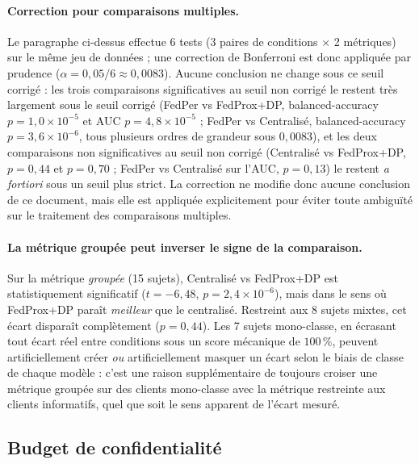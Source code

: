 \documentclass{acmart}
\begin{document}
\paragraph{Correction pour comparaisons multiples.} Le paragraphe ci-dessus
effectue 6 tests (3 paires de conditions $\times$ 2 métriques) sur le même
jeu de données ; une correction de Bonferroni est donc appliquée par
prudence ($\alpha = 0{,}05/6 \approx 0{,}0083$). Aucune conclusion ne change
sous ce seuil corrigé : les trois comparaisons significatives au seuil non
corrigé le restent très largement sous le seuil corrigé (FedPer vs
FedProx+DP, balanced-accuracy $p=1{,}0\times10^{-5}$ et AUC
$p=4{,}8\times10^{-5}$ ; FedPer vs Centralisé, balanced-accuracy
$p=3{,}6\times10^{-6}$, tous plusieurs ordres de grandeur sous
$0{,}0083$), et les deux comparaisons non significatives au seuil non
corrigé (Centralisé vs FedProx+DP, $p=0{,}44$ et $p=0{,}70$ ; FedPer vs
Centralisé sur l'AUC, $p=0{,}13$) le restent \emph{a fortiori} sous un seuil
plus strict. La correction ne modifie donc aucune conclusion de ce document,
mais elle est appliquée explicitement pour éviter toute ambiguïté sur le
traitement des comparaisons multiples.

\paragraph{La métrique groupée peut inverser le signe de la comparaison.}
Sur la métrique \emph{groupée} (15 sujets), Centralisé vs FedProx+DP est
statistiquement significatif ($t=-6{,}48$, $p=2{,}4\times10^{-6}$), mais dans
le sens où FedProx+DP paraît \emph{meilleur} que le centralisé. Restreint aux
8 sujets mixtes, cet écart disparaît complètement ($p=0{,}44$). Les 7 sujets
mono-classe, en écrasant tout écart réel entre conditions sous un score
mécanique de $100\,\%$, peuvent artificiellement créer \emph{ou} artificiellement
masquer un écart selon le biais de classe de chaque modèle : c'est une raison
supplémentaire de toujours croiser une métrique groupée sur des clients
mono-classe avec la métrique restreinte aux clients informatifs, quel que
soit le sens apparent de l'écart mesuré.

\subsection{Budget de confidentialité}
\end{document}
